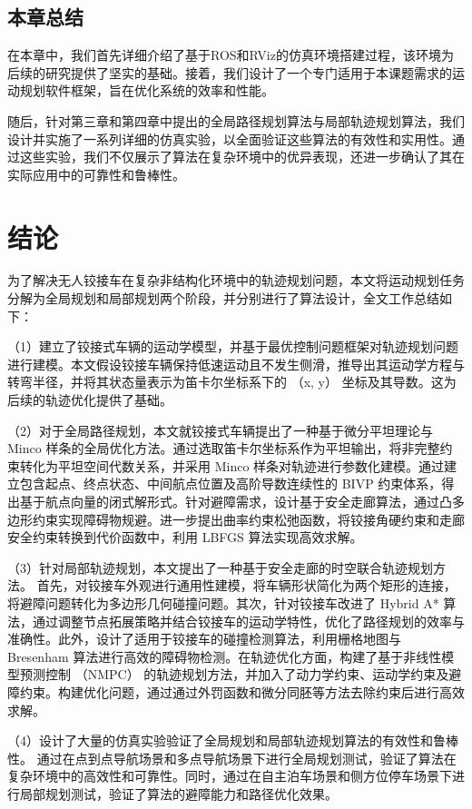 \documentclass[master,academic]{ysuthesis} %
\begin{document}
	\section{本章总结}
	在本章中，我们首先详细介绍了基于ROS和RViz的仿真环境搭建过程，该环境为后续的研究提供了坚实的基础。接着，我们设计了一个专门适用于本课题需求的运动规划软件框架，旨在优化系统的效率和性能。

	随后，针对第三章和第四章中提出的全局路径规划算法与局部轨迹规划算法，我们设计并实施了一系列详细的仿真实验，以全面验证这些算法的有效性和实用性。通过这些实验，我们不仅展示了算法在复杂环境中的优异表现，还进一步确认了其在实际应用中的可靠性和鲁棒性。

	\chapter{结论}
	为了解决无人铰接车在复杂非结构化环境中的轨迹规划问题，本文将运动规划任务分解为全局规划和局部规划两个阶段，并分别进行了算法设计，全文工作总结如下：

	（1）建立了铰接式车辆的运动学模型，并基于最优控制问题框架对轨迹规划问题进行建模。本文假设铰接车辆保持低速运动且不发生侧滑，推导出其运动学方程与转弯半径，并将其状态量表示为笛卡尔坐标系下的 （x, y） 坐标及其导数。这为后续的轨迹优化提供了基础。

	（2）对于全局路径规划，本文就铰接式车辆提出了一种基于微分平坦理论与 Minco 样条的全局优化方法。通过选取笛卡尔坐标系作为平坦输出，将非完整约束转化为平坦空间代数关系，并采用 Minco 样条对轨迹进行参数化建模。通过建立包含起点、终点状态、中间航点位置及高阶导数连续性的 BIVP 约束体系，得出基于航点向量的闭式解形式。针对避障需求，设计基于安全走廊算法，通过凸多边形约束实现障碍物规避。进一步提出曲率约束松弛函数，将铰接角硬约束和走廊安全约束转换到代价函数中，利用 LBFGS 算法实现高效求解。

	（3）针对局部轨迹规划，本文提出了一种基于安全走廊的时空联合轨迹规划方法。 首先，对铰接车外观进行通用性建模，将车辆形状简化为两个矩形的连接，将避障问题转化为多边形几何碰撞问题。其次，针对铰接车改进了 Hybrid A* 算法，通过调整节点拓展策略并结合铰接车的运动学特性，优化了路径规划的效率与准确性。此外，设计了适用于铰接车的碰撞检测算法，利用栅格地图与 Bresenham 算法进行高效的障碍物检测。在轨迹优化方面，构建了基于非线性模型预测控制 （NMPC） 的轨迹规划方法，并加入了动力学约束、运动学约束及避障约束。构建优化问题，通过通过外罚函数和微分同胚等方法去除约束后进行高效求解。

	（4）设计了大量的仿真实验验证了全局规划和局部轨迹规划算法的有效性和鲁棒性。 通过在点到点导航场景和多点导航场景下进行全局规划测试，验证了算法在复杂环境中的高效性和可靠性。同时，通过在自主泊车场景和侧方位停车场景下进行局部规划测试，验证了算法的避障能力和路径优化效果。
\end{document}
